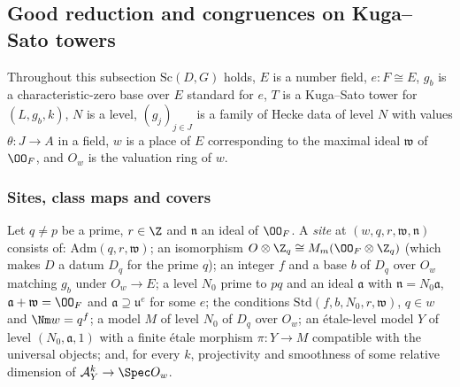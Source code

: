 \subsection{Good reduction and congruences on Kuga--Sato towers}\label{pf:ks2:sec:good}

Throughout this subsection $\mathrm{Sc}(D,G)$ holds, $E$ is a number field, $e\colon F\cong E$, $g_b$ is
a characteristic-zero base over $E$ standard for $e$, $T$ is a Kuga--Sato tower for $(L,g_b,k)$, $N$
is a level, $(g_j)_{j\in J}$ is a family of Hecke data of level $N$ with values
$\theta\colon J\to A$ in a field, $w$ is a place of $E$ corresponding to the maximal ideal
$\mathfrak w$ of $\kstwoOF$, and $O_w$ is the valuation ring of $w$.

\subsubsection{Sites, class maps and covers}

\begin{definition}[Sites]\label{pf:ks2:def:site}
Let $q\ne p$ be a prime, $r\in\Z$ and $\mathfrak n$ an ideal of $\kstwoOF$. A \emph{site} at
$(w,q,r,\mathfrak w,\mathfrak n)$ consists of:
$\mathrm{Adm}(q,r,\mathfrak w)$; an isomorphism $O\otimes\Z_q\cong M_m(\kstwoOF\otimes\Z_q)$
(which makes $D$ a datum $D_q$ for the prime $q$); an
integer $f$ and a base $b$ of $D_q$ over $O_w$ matching $g_b$ under $O_w\to E$; a level $N_0$ prime
to $pq$ and an ideal $\mathfrak a$ with $\mathfrak n=N_0\mathfrak a$, $\mathfrak a+\mathfrak
w=\kstwoOF$ and $\mathfrak a\supseteq\mathfrak u^e$ for some $e$; the conditions
$\mathrm{Std}(f,b,N_0,r,\mathfrak w)$, $q\in w$ and $\Nm w=q^f$; a model $M$ of level $N_0$ of $D_q$
over $O_w$; an \'etale-level model $Y$ of level $(N_0,\mathfrak a,1)$ with a finite \'etale morphism
$\pi\colon Y\to M$ compatible with the universal objects; and, for every $k$, projectivity and
smoothness of some relative dimension of $\kstwoKS_Y^k\to\Spec O_w$.
\end{definition}

